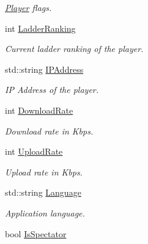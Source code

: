 \begin{DoxyCompactItemize}
\begin{DoxyCompactList}\small\item\em \hyperlink{structPlayer}{Player} flags. \end{DoxyCompactList}\item 
\hypertarget{structPlayer_a25fe69852f0e38f541ad615cd59877ef}{int \hyperlink{structPlayer_a25fe69852f0e38f541ad615cd59877ef}{Ladder\-Ranking}}\label{structPlayer_a25fe69852f0e38f541ad615cd59877ef}

\begin{DoxyCompactList}\small\item\em Current ladder ranking of the player. \end{DoxyCompactList}\item 
\hypertarget{structPlayer_a388787a2218deeaf7318f0fbbd3f5d0f}{std\-::string \hyperlink{structPlayer_a388787a2218deeaf7318f0fbbd3f5d0f}{I\-P\-Address}}\label{structPlayer_a388787a2218deeaf7318f0fbbd3f5d0f}

\begin{DoxyCompactList}\small\item\em I\-P Address of the player. \end{DoxyCompactList}\item 
\hypertarget{structPlayer_a7fcee993ceed3c2b737782bc549e11bf}{int \hyperlink{structPlayer_a7fcee993ceed3c2b737782bc549e11bf}{Download\-Rate}}\label{structPlayer_a7fcee993ceed3c2b737782bc549e11bf}

\begin{DoxyCompactList}\small\item\em Download rate in Kbps. \end{DoxyCompactList}\item 
\hypertarget{structPlayer_a28f9a31a54ac8ea0658a6b234523b29d}{int \hyperlink{structPlayer_a28f9a31a54ac8ea0658a6b234523b29d}{Upload\-Rate}}\label{structPlayer_a28f9a31a54ac8ea0658a6b234523b29d}

\begin{DoxyCompactList}\small\item\em Upload rate in Kbps. \end{DoxyCompactList}\item 
\hypertarget{structPlayer_a583abe4cc5985fc83bfed62362efa358}{std\-::string \hyperlink{structPlayer_a583abe4cc5985fc83bfed62362efa358}{Language}}\label{structPlayer_a583abe4cc5985fc83bfed62362efa358}

\begin{DoxyCompactList}\small\item\em Application language. \end{DoxyCompactList}\item 
\hypertarget{structPlayer_a61ba0e32d336f5cd1eb152addf6848d2}{bool \hyperlink{structPlayer_a61ba0e32d336f5cd1eb152addf6848d2}{Is\-Spectator}}\label{structPlayer_a61ba0e32d336f5cd1eb152addf6848d2}


\end{DoxyCompactItemize}
